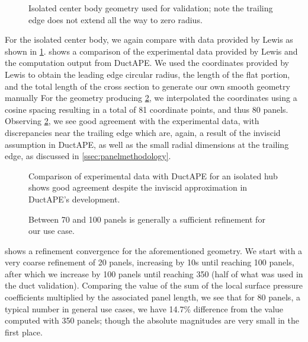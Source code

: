\begin{figure}[hb!]
    \centering
        
        \caption{Isolated center body geometry used for validation; note the trailing edge does not extend all the way to zero radius.}
    \label{fig:cbgeom}
\end{figure}

For the isolated center body, we again compare with data provided by Lewis as shown in \cref{fig:cbgeom}.
%
 shows a comparison of the experimental data provided by Lewis and the computation output from DuctAPE.
%
We used the coordinates provided by Lewis to obtain the leading edge circular radius, the length of the flat portion, and the total length of the cross section to generate our own smooth geometry manually
%
For the geometry producing \cref{fig:isolatedhubvalidation}, we interpolated the coordinates using a cosine spacing resulting in a total of 81 coordinate points, and thus 80 panels.
%
Observing \cref{fig:isolatedhubvalidation}, we see good agreement with the experimental data, with discrepancies near the trailing edge which are, again, a result of the inviscid assumption in DuctAPE, as well as the small radial dimensions at the trailing edge, as discussed in \cref{ssec:panelmethodology}.

\begin{figure}[h!]
    \centering
        
        \caption{Comparison of experimental data with DuctAPE for an isolated hub shows good agreement despite the inviscid approximation in DuctAPE's development.}
    \label{fig:isolatedhubvalidation}
\end{figure}

\begin{figure}[hb!]
    \centering
        \caption{Between 70 and 100 panels is generally a sufficient refinement for our use case.}
    \label{fig:isolatedhubgridconv}
\end{figure}


 shows a refinement convergence for the aforementioned geometry.
%
We start with a very coarse refinement of 20 panels, increasing by 10s until reaching 100 panels, after which we increase by 100 panels until reaching 350 (half of what was used in the duct validation).
%
Comparing the value of the sum of the local surface pressure coefficients multiplied by the associated panel length, we see that for 80 panels, a typical number in general use cases, we have 14.7\% difference from the value computed with 350 panels; though the absolute magnitudes are very small in the first place.



